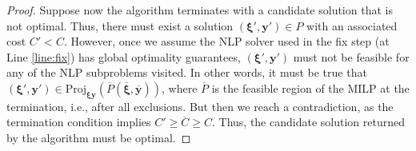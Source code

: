 \documentclass[pdflatex,sn-mathphys-num]{sn-jnl}%
\newcommand{\new}[1]{#1}
\begin{document}
\begin{proof}
\new{%
Suppose now the algorithm terminates with a candidate solution that is not optimal.
Thus, there must exist a solution $(\bm{\xi}',\bm{y}')\in P$ with an associated cost $C' < C$.
However, once we assume the NLP solver used in the fix step (at Line \ref{line:fix}) has global optimality guarantees, $(\bm{\xi}',\bm{y}')$ must not be feasible for any of the NLP subproblems visited.
In other words, it must be true that $(\bm{\xi}',\bm{y}') \in \text{Proj}_{\bm{\xi}\bm{y}}(\overline{P}(\overline{\bm{\xi}},\overline{\bm{y}}))$, where $\overline{P}$ is the feasible region of the MILP at the termination, i.e., after all exclusions.
But then we reach a contradiction, as the termination condition implies $C' \ge \overline{C} \ge C$.
Thus, the candidate solution returned by the algorithm must be optimal.
}
\end{proof}
\end{document}
